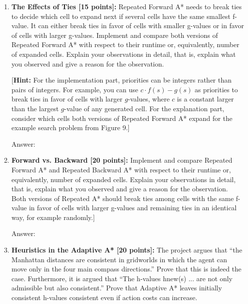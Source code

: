 \documentclass[12pt]{article}
\begin{document}
\begin{enumerate}
\begin{enumerate}
{	
		b\\
	}
	
  \end{enumerate}

  \item \textbf{The Effects of Ties [15 points]:} Repeated Forward A* needs to break ties to decide which cell to expand next if several cells have the same smallest f-value. It can either break ties in favor of cells with smaller g-values or in favor of cells with larger g-values. Implement and compare both versions of Repeated Forward A* with respect to their runtime or, equivalently, number of expanded cells. Explain your observations in detail, that is, explain what you observed and give a reason for the observation.
  
   [\textbf{Hint:} For the implementation part, priorities can be integers rather than pairs of integers. For example, you can use $c \cdot f(s)-g(s)$  as priorities to break ties in favor of cells with larger $g$-values, where $c$ is a constant larger than the largest $g$-value of any generated cell. For the explanation part, consider which cells both versions of Repeated Forward A* expand for the example search problem from Figure 9.]
    
    {\color{blue}Answer: 
        \\
    }

  \item \textbf{Forward vs. Backward [20 points]:} Implement and compare Repeated Forward A* and Repeated Backward A* with respect to their runtime or, equivalently, number of expanded cells. Explain your observations in detail, that is, explain what you observed and give a reason for the observation. Both versions of Repeated A* should break ties among cells with the same f-value in favor of cells with larger g-values and remaining ties in an identical way, for example randomly.]
  
    
  {\color{blue}Answer: 
  	\\
  }
  
  \item \textbf{Heuristics in the Adaptive A* [20 points]:} The project argues that “the Manhattan distances are consistent in gridworlds in which the agent can move only in the four main compass directions.” Prove that this is indeed the case.
Furthermore, it is argued that “The h-values hnew(s) ... are not only admissible but also consistent.” Prove that Adaptive A* leaves initially consistent h-values consistent even if action costs can increase.
  

\end{enumerate}
\end{document}
